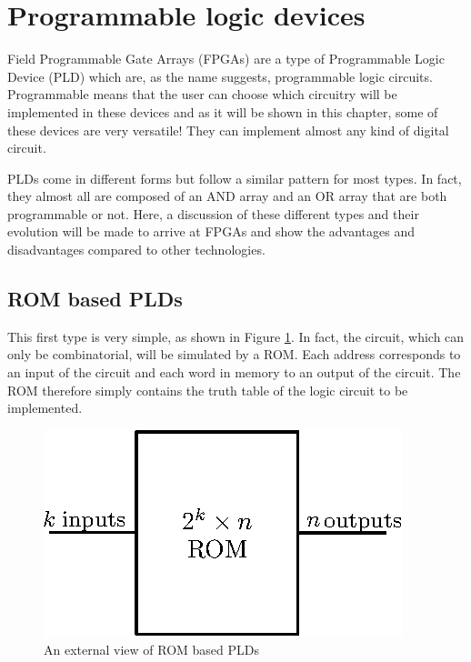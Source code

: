 \section{Programmable logic devices}

Field Programmable Gate Arrays (FPGAs) are a type of Programmable Logic Device (PLD) which are, as 
the name suggests, programmable logic circuits. Programmable means that the user can choose which 
circuitry will be implemented in these devices and as it will be shown in this chapter, some of 
these devices are very versatile! They can implement almost any kind of digital circuit.

PLDs come in different forms but follow a similar pattern for most types. In fact, they almost all 
are composed of an AND array and an OR array that are both programmable or not. Here, a discussion 
of these different types and their evolution will be made to arrive at FPGAs and show the advantages 
and disadvantages compared to other technologies.

\subsection{ROM based PLDs}

This first type is very simple, as shown in Figure \ref{fig:fpga/pld_rom_external}. In fact, the 
circuit, which can only be combinatorial, will be simulated by a ROM. Each address corresponds to 
an input of the circuit and each word in memory to an output of the circuit. The ROM therefore 
simply contains the truth table of the logic circuit to be implemented.

\begin{figure}[H]
    \centering
    \includegraphics[scale=1.2]{Chapter1-Hardware/res/pld_rom_external}
    \caption{An external view of ROM based PLDs}
    \label{fig:fpga/pld_rom_external}
\end{figure}

